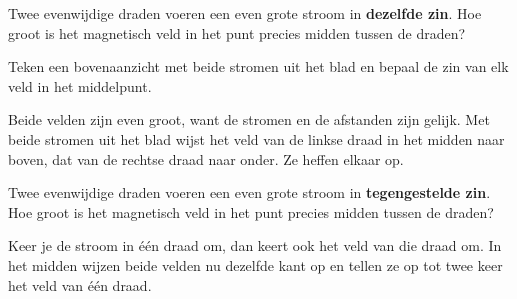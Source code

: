 \documentclass{ximera}
\begin{document}
\begin{question}
    Twee evenwijdige draden voeren een even grote stroom in \textbf{dezelfde zin}. Hoe groot is het magnetisch veld in het punt precies midden tussen de draden?

    \begin{multipleChoice}
    \end{multipleChoice}

    \begin{hint}
        Teken een bovenaanzicht met beide stromen uit het blad en bepaal de zin van elk veld in het middelpunt.
    \end{hint}

    \begin{solution}\nl
        Beide velden zijn even groot, want de stromen en de afstanden zijn gelijk. Met beide stromen uit het blad wijst het veld van de linkse draad in het midden naar boven, dat van de rechtse draad naar onder. Ze heffen elkaar op.
    \end{solution}
\end{question}

\begin{question}
    Twee evenwijdige draden voeren een even grote stroom in \textbf{tegengestelde zin}. Hoe groot is het magnetisch veld in het punt precies midden tussen de draden?

    \begin{multipleChoice}
    \end{multipleChoice}

    \begin{solution}\nl
        Keer je de stroom in één draad om, dan keert ook het veld van die draad om. In het midden wijzen beide velden nu dezelfde kant op en tellen ze op tot twee keer het veld van één draad.
    \end{solution}
\end{question}
\end{document}
